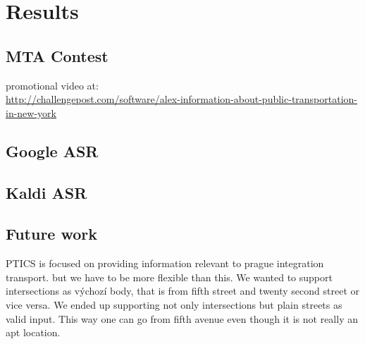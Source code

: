 \chapter{Results}


\section{MTA Contest}

promotional video at: \\
\url{http://challengepost.com/software/alex-information-about-public-transportation-in-new-york}

\section{Google ASR}
\section{Kaldi ASR}

\section{Future work}






PTICS is focused on providing information relevant to prague integration transport. but we have to be more flexible than this. We wanted to support intersections as výchozí body, that is from fifth street and twenty second street or vice versa. We ended up supporting not only intersections but plain streets as valid input. This way one can go from fifth avenue even though it is not really an apt location.



